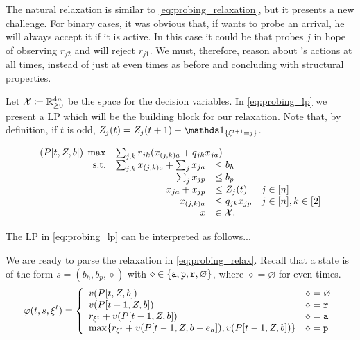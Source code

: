 The natural relaxation is similar to \cref{eq:probing_relaxation}, but it presents a new challenge.
For binary cases, it was obvious that, if \off wants to probe an arrival, he will always accept it if it is active.
In this case it could be that \off probes $j$ in hope of observing $r_{j2}$ and will reject $r_{j1}$.
We must, therefore, reason about \off's actions at all times, instead of just at even times as before and concluding with structural properties.

Let $\mathcal{X}\coloneqq\mathbb{R}_{\geq 0}^{4n}$ be the space for the decision variables.
In \cref{eq:probing_lp} we present a LP which will be the building block for our relaxation.
Note that, by definition, if $t$ is odd, $Z_j(t)=Z_j(t+1)-\In{\xi^{t+1}=j}$.

\begin{equation}\label{eq:probing_lp}
\begin{array}{rrll}
(P[t,Z,b]) \; \max & \multicolumn{3}{l}{\sum_{j,k}r_{jk}(x_{(j,k)a}+q_{jk}x_{ja})} \\
\text{s.t.}& \sum_{j,k}x_{(j,k)a}+\sum_jx_{ja} &\leq b_h  \\
&  \sum_j x_{jp} & \leq b_p   \\
&  x_{ja} +x_{jp} & \leq Z_j(t)  & j\in [n] \\
& x_{(j,k)a} &\leq q_{jk}x_{jp} &  j \in [n],k\in [2]\\ 
& x&\in\calX.
\end{array}
\end{equation}

The LP in \cref{eq:probing_lp} can be interpreted as follows...\todonote

We are ready to parse the relaxation in \cref{eq:probing_relax}.
Recall that a state is of the form $s=(b_h,b_p,\diamond)$ with $\diamond\in \{\texttt{a},\texttt{p},\texttt{r},\varnothing\}$, where $\diamond=\varnothing$ for even times.
\begin{equation}\label{eq:probing_relax}
\varphi(t,s,\xi^t) = \left\{ 
\begin{array}{ll}
v(P[t,Z,b]) & \diamond=\varnothing \\ 
v(P[t-1,Z,b]) & \diamond = \texttt{r} \\ 
r_{\xi^t}+v(P[t-1,Z,b]) & \diamond = \texttt{a} \\ 
\max\{r_{\xi^t}+v(P[t-1,Z,b-e_h]),v(P[t-1,Z,b])\} & \diamond = \texttt{p}
\end{array} 
\right.
\end{equation}

